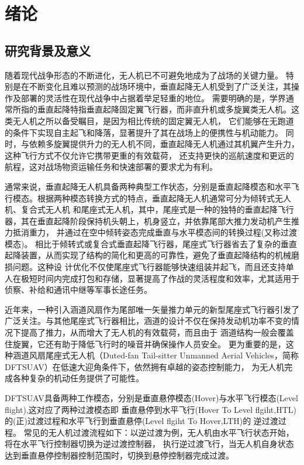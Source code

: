 \chapter{绪论}
\section{研究背景及意义}
随着现代战争形态的不断进化，无人机已不可避免地成为了战场的关键力量。
特别是在不断变化且难以预测的战场环境中，垂直起降无人机受到了广泛关注，其操作及部署的灵活性在现代战争中占据着举足轻重的地位。
需要明确的是，学界通常所指的垂直起降特指垂直起降固定翼飞行器，而非直升机或多旋翼类无人机。这类无人机之所以备受瞩目，是因为相比传统的固定翼无人机，
它们能够在无跑道的条件下实现自主起飞和降落，显著提升了其在战场上的便携性与机动能力。
同时，与依赖多旋翼提供升力的无人机不同，垂直起降无人机通过其机翼产生升力，这种飞行方式不仅允许它携带更重的有效载荷，
还支持更快的巡航速度和更远的航程，这对战场物资运输任务和快速部署的要求尤为有利\cite{okulski2022small}。

通常来说，垂直起降无人机具备两种典型工作状态，分别是垂直起降模态和水平飞行模态。根据两种模态转换方式的特点，垂直起降无人机通常可分为倾转式无人机、复合式无人机
和尾座式无人机，其中，尾座式是一种的独特的垂直起降飞行器，其在垂直起降阶段保持机头朝上，机身竖立，并依靠尾部大推力发动机产生推力抵消重力，
并通过在空中倾转姿态完成垂直与水平模态间的转换过程(又称过渡模态)\cite{FJSJ202401002}。
相比于倾转式或复合式垂直起降飞行器，尾座式飞行器省去了复杂的垂直起降装置，从而实现了结构的简化和更高的可靠性，避免了垂直起降结构的机械磨损问题。这种设
计优化不仅使尾座式飞行器能够快速组装并起飞，而且还支持单人在极短时间内完成打包和存储，显著提高了作战的灵活程度和效率，尤其适用于侦察、补给和通讯中继等军事长途任务\cite{ZGHU201709002010}。

近年来，一种引入涵道风扇作为尾部唯一矢量推力单元的新型尾座式飞行器引发了广泛关注。与其他尾座式飞行器相比，涵道的设计不仅在保持发动机功率不变的情况下提高了推力，从而增大了无人机的有效载荷，而且由于
涵道结构一般会覆盖住旋翼，它还有助于降低飞行时的噪音并确保操作人员安全。
更为重要的是，这种涵道风扇尾座式无人机（Duted-fan Tail-sitter Unmanned Aerial Vehicles，简称DFTSUAV）在低速大迎角条件下，依然拥有卓越的姿态控制能力，
为无人机完成各种复杂的机动任务提供了可能性\cite{FHDD201912009}。

DFTSUAV具备两种工作模态，分别是垂直悬停模态(Hover)与水平飞行模态(Level flight),这对应了两种过渡模态即
垂直悬停到水平飞行(Hover To Level flgiht,HTL)的(正)过渡过程和水平飞行到垂直悬停(Level flgiht To Hover,LTH)的
逆过渡过程\cite{1021894646.nh}。 常见的无人机过渡流程如下：以逆过渡为例，无人机由水平飞行状态开始，将在水平飞行控制器切换为逆过渡控制器，
执行逆过渡飞行，当无人机自身状态达到垂直悬停控制器控制范围时，切换到悬停控制器完成过渡。

